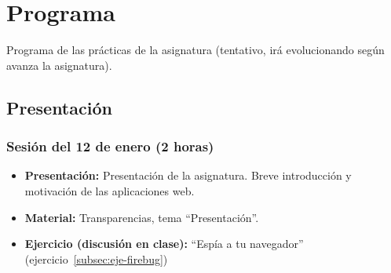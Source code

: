 \documentclass[a4paper,12pt]{report}
\begin{document}








\chapter{Programa}

Programa de las prácticas de la asignatura (tentativo, irá evolucionando según avanza la asignatura).

\section{Presentación}

\subsection{Sesión del 12 de enero (2 horas)}

\begin{itemize}
\item \textbf{Presentación:} Presentación de la asignatura. Breve introducción y motivación de las aplicaciones web.
\item \textbf{Material:} Transparencias, tema ``Presentación''.
\item \textbf{Ejercicio (discusión en clase):} ``Espía a tu navegador'' (ejercicio~\ref{subsec:eje-firebug})
\end{itemize}
\end{document}
